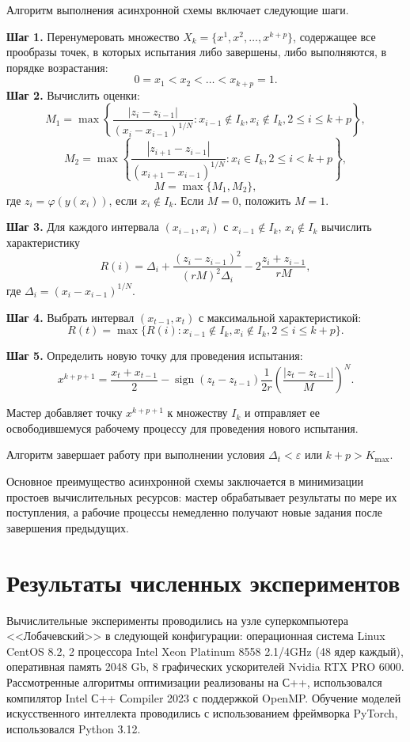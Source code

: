 \documentclass[11pt, oneside, a4paper]{article}
\begin{document}
Алгоритм выполнения асинхронной схемы включает следующие шаги.

\textbf{Шаг 1.} Перенумеровать множество $X_k = \{x^1, x^2, \ldots, x^{k+p}\}$, содержащее все прообразы точек, в которых испытания либо завершены, либо выполняются, в порядке возрастания:
\[
0 = x_1 < x_2 < \ldots < x_{k+p} = 1.
\]
\textbf{Шаг 2.} Вычислить оценки:
\[
M_1 = \max\left\{ \frac{|z_i - z_{i-1}|}{(x_i - x_{i-1})^{1/N}} : x_{i-1} \notin I_k, x_i \notin I_k, 2 \leq i \leq k+p \right\},
\]
\[
M_2 = \max\left\{ \frac{|z_{i+1} - z_{i-1}|}{(x_{i+1} - x_{i-1})^{1/N}} : x_i \in I_k, 2 \leq i < k+p \right\},
\]
\[
M = \max\{M_1, M_2\},
\]
где $z_i = \varphi(y(x_i))$, если $x_i \notin I_k$. Если $M = 0$, положить $M = 1$.

\textbf{Шаг 3.} Для каждого интервала $(x_{i-1}, x_i)$ с $x_{i-1} \notin I_k$, $x_i \notin I_k$ вычислить характеристику
\[
R(i) = \Delta_i + \frac{(z_i - z_{i-1})^2}{(rM)^2\Delta_i} - 2\frac{z_i + z_{i-1}}{rM},
\]
где $\Delta_i = (x_i - x_{i-1})^{1/N}$.

\textbf{Шаг 4.} Выбрать интервал $(x_{t-1}, x_t)$ с максимальной характеристикой:
\[
R(t) = \max\{ R(i) : x_{i-1} \notin I_k, x_i \notin I_k, 2 \leq i \leq k+p \}.
\]

\textbf{Шаг 5.} Определить новую точку для проведения испытания:
\[
x^{k+p+1} = \frac{x_t + x_{t-1}}{2} - \operatorname{sign}(z_t - z_{t-1}) \frac{1}{2r} \left( \frac{|z_t - z_{t-1}|}{M} \right)^N.
\]

Мастер добавляет точку $x^{k+p+1}$ к множеству $I_k$ и отправляет ее освободившемуся рабочему процессу для проведения нового испытания.

Алгоритм завершает работу при выполнении условия $\Delta_t < \varepsilon$ или $k+p > K_{\max}$.

Основное преимущество асинхронной схемы заключается в минимизации простоев вычислительных ресурсов: мастер обрабатывает результаты по мере их поступления, а рабочие процессы немедленно получают новые задания после завершения предыдущих.


\section{Результаты численных экспериментов}
\label{sec-result}

Вычислительные эксперименты проводились на узле суперкомпьютера <<Лобачевский>> в следующей конфигурации: операционная система Linux CentOS 8.2, 2 процессора Intel Xeon Platinum 8558 2.1/4GHz (48 ядер каждый), оперативная память 2048 Gb, 8 графических ускорителей Nvidia RTX PRO 6000. 
Рассмотренные алгоритмы оптимизации реализованы на С++, использовался компилятор Intel С++ Сompiler 2023 с поддержкой OpenMP. Обучение моделей искусственного интеллекта проводились с использованием фреймворка PyTorch, использовался Python 3.12.
\end{document}
